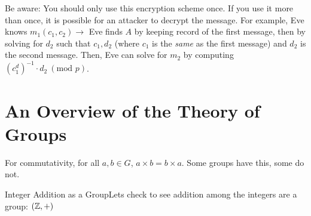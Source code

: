 \begin{note}
    Be aware: You should only use this encryption scheme once. If you use it more than once, it is possible for an attacker to decrypt the message. For example, Eve knows \(m_1(c_1, c_2) \rightarrow\) Eve finds \(A\) by keeping record of the first message, then by solving for \(d_2\) such that \(c_1, d_2\) (where \(c_1\) is the \textit{same} as the first message) and \(d_2\) is the second message. Then, Eve can solve for \(m_2\) by computing \({(c_1^d)}^{-1} \cdot d_2 \ (\text{mod } p)\).
\end{note}







\hypertarget{2.5}{}
\section{An Overview of the Theory of Groups}


For commutativity, for all \(a,b \in G\), \(a\times b = b \times a\). Some groups have this, some do not. \\

\begin{example}
    {Integer Addition as a Group}Lets check to see addition among the integers are a group: \((\mathbb{Z}, +)\)
\end{example}


